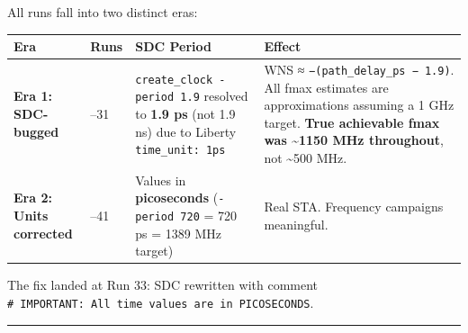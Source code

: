 \begin{record}

All runs fall into two distinct eras:

{\footnotesize\setlength{\tabcolsep}{3pt}

{
\begin{longtable}[]{@{}
  >{\raggedright\arraybackslash}p{}
  >{\raggedright\arraybackslash}p{}
  >{\raggedright\arraybackslash}p{}
  >{\raggedright\arraybackslash}p{}@{}}
\toprule\noalign{}
\begin{minipage}[b]{\linewidth}\raggedright
Era
\end{minipage} & \begin{minipage}[b]{\linewidth}\raggedright
Runs
\end{minipage} & \begin{minipage}[b]{\linewidth}\raggedright
SDC Period
\end{minipage} & \begin{minipage}[b]{\linewidth}\raggedright
Effect
\end{minipage} \\
\midrule\noalign{}
\endhead
\bottomrule\noalign{}
\endlastfoot
\textbf{Era 1: SDC-bugged} & 7--31 &
\texttt{create\_\allowbreak{}clock\ -\allowbreak{}period\ 1.\allowbreak{}9}
resolved to \textbf{1.9 ps} (not 1.9 ns) due to Liberty
\texttt{time\_\allowbreak{}unit:\allowbreak{}\ 1ps} & WNS ≈
\texttt{−(path\_\allowbreak{}delay\_\allowbreak{}ps\ −\ 1.\allowbreak{}9)}.
All fmax estimates are approximations assuming a 1 GHz target.
\textbf{True achievable fmax was \textasciitilde1150 MHz throughout},
not \textasciitilde500 MHz. \\
\textbf{Era 2: Units corrected} & 32--41 & Values in
\textbf{picoseconds} (\texttt{-\allowbreak{}period\ 720} = 720 ps = 1389
MHz target) & Real STA. Frequency campaigns meaningful. \\
\end{longtable}
}

}

The fix landed at Run 33: SDC rewritten with comment
\texttt{\#\ IMPORTANT:\allowbreak{}\ All\ time\ values\ are\ in\ PICOSECONDS}.

\begin{center}\rule{0.5\linewidth}{0.5pt}\end{center}

\end{record}

